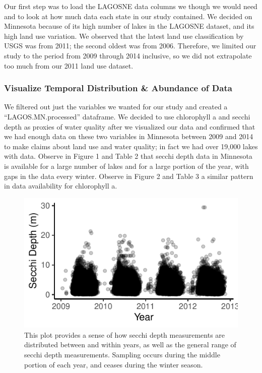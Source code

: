 \documentclass[12pt,]{article}
\begin{document}
Our first step was to load the LAGOSNE data columns we though we would
need and to look at how much data each state in our study contained. We
decided on Minnesota because of its high number of lakes in the LAGOSNE
dataset, and its high land use variation. We observed that the latest
land use classification by USGS was from 2011; the second oldest was
from 2006. Therefore, we limited our study to the period from 2009
through 2014 inclusive, so we did not extrapolate too much from our 2011
land use dataset.

\hypertarget{visualize-temporal-distribution-abundance-of-data}{%
\subsubsection{Visualize Temporal Distribution \& Abundance of
Data}\label{visualize-temporal-distribution-abundance-of-data}}

We filtered out just the variables we wanted for our study and created a
``LAGOS.MN.processed'' dataframe. We decided to use chlorophyll a and
secchi depth as proxies of water quality after we visualized our data
and confirmed that we had enough data on these two variables in
Minnesota between 2009 and 2014 to make claims about land use and water
quality; in fact we had over 19,000 lakes with data. Observe in Figure 1
and Table 2 that secchi depth data in Minnesota is available for a large
number of lakes and for a large portion of the year, with gaps in the
data every winter. Observe in Figure 2 and Table 3 a similar pattern in
data availability for chlorophyll a.

\begin{figure}
\centering
\includegraphics{Bollt_Greif_Raby_Roth_Project_Final_files/figure-latex/Visualize_data-1.pdf}
\caption{This plot provides a sense of how secchi depth measurements are
distributed between and within years, as well as the general range of
secchi depth measurements. Sampling occurs during the middle portion of
each year, and ceases during the winter season.}
\end{figure}
\end{document}
